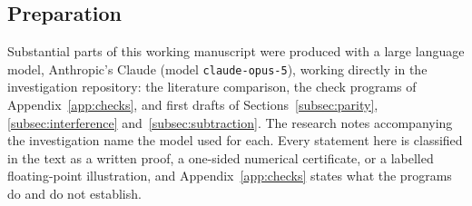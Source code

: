 \subsection*{Preparation}
Substantial parts of this working manuscript were produced with a large
language model, Anthropic's Claude (model \texttt{claude-opus-5}), working
directly in the investigation repository: the literature comparison, the
check programs of Appendix~\ref{app:checks}, and first drafts of
Sections~\ref{subsec:parity}, \ref{subsec:interference}
and~\ref{subsec:subtraction}. The research notes accompanying the
investigation name the model used for each. Every statement here is
classified in the text as a written proof, a one-sided numerical certificate,
or a labelled floating-point illustration, and Appendix~\ref{app:checks}
states what the programs do and do not establish.
